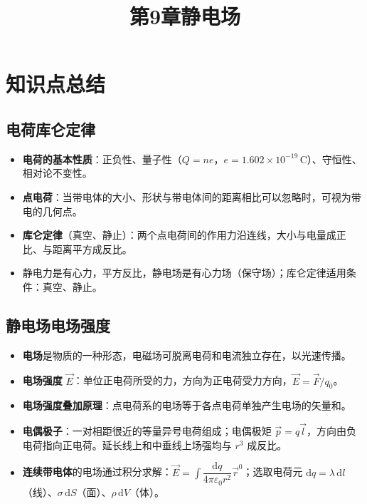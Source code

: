 \documentclass[12pt,a4paper]{ctexart}
\title{第9章\quad 静电场}
\author{}
\date{}
\begin{document}
\maketitle

\section{知识点总结}

\subsection{电荷\quad 库仑定律}

\begin{itemize}
    \item \textbf{电荷的基本性质}：正负性、量子性（$Q=ne$，$e=1.602\times10^{-19}\,\text{C}$）、守恒性、相对论不变性。
    \item \textbf{点电荷}：当带电体的大小、形状与带电体间的距离相比可以忽略时，可视为带电的几何点。
    \item \textbf{库仑定律}（真空、静止）：两个点电荷间的作用力沿连线，大小与电量成正比、与距离平方成反比。
    \item 静电力是有心力，平方反比，静电场是有心力场（保守场）；库仑定律适用条件：真空、静止。
\end{itemize}

\subsection{静电场\quad 电场强度}

\begin{itemize}
    \item \textbf{电场}是物质的一种形态，电磁场可脱离电荷和电流独立存在，以光速传播。
    \item \textbf{电场强度} $\vec E$：单位正电荷所受的力，方向为正电荷受力方向，$\vec E=\vec F/q_0$。
    \item \textbf{电场强度叠加原理}：点电荷系的电场等于各点电荷单独产生电场的矢量和。
    \item \textbf{电偶极子}：一对相距很近的等量异号电荷组成；电偶极矩 $\vec p=q\vec l$，方向由负电荷指向正电荷。延长线上和中垂线上场强均与 $r^3$ 成反比。
    \item \textbf{连续带电体}的电场通过积分求解：$\vec E=\displaystyle\int \dfrac{\mathrm d q}{4\pi\varepsilon_0 r^2}\vec r^0$；选取电荷元 $\mathrm dq=\lambda\,\mathrm dl$（线）、$\sigma\,\mathrm dS$（面）、$\rho\,\mathrm dV$（体）。
\end{itemize}
\end{document}
